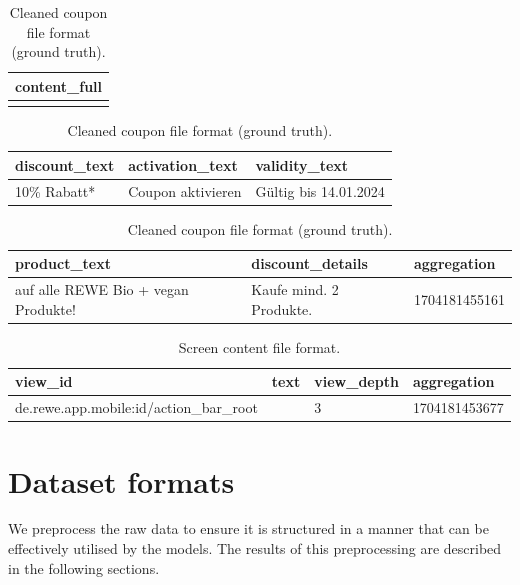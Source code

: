 \documentclass[licencjacka,en]{pracamgr}
\begin{document}
\begin{table}[htbp]
\centering

\begin{tabular}{|p{}|}
\hline
\textbf{content\_full} \\
\hline
[Treuepunkte, 10\% Rabatt*, auf alle REWE Bio + vegan Produkte!,
Kaufe mind. 2 Produkte., Gültig bis 14.01.2024, Coupon aktivieren] \\
\hline
\end{tabular}

\vspace{1em}

\begin{tabular}{|l|l|l|}
\hline
\textbf{discount\_text} & \textbf{activation\_text} & \textbf{validity\_text} \\
\hline
10\% Rabatt* & Coupon aktivieren & Gültig bis 14.01.2024 \\
\hline
\end{tabular}

\vspace{1em}

\begin{tabular}{|l|l|l|}
\hline
\textbf{product\_text} & \textbf{discount\_details} & \textbf{aggregation} \\
\hline
auf alle REWE Bio + vegan Produkte! & Kaufe mind. 2 Produkte. & 1704181455161 \\
\hline
\end{tabular}

\caption{Cleaned coupon file format (ground truth).}
\label{tab:coupons_rev_2}
\end{table}

\begin{table}[htbp]
\centering
\begin{tabular}{|l|l|l|l|}
\hline
\textbf{view\_id} & \textbf{text} & \textbf{view\_depth} & \textbf{aggregation} \\
\hline
de.rewe.app.mobile:id/action\_bar\_root &  & 3 & 1704181453677 \\
\hline
\end{tabular}
\caption{Screen content file format.}
\label{tab:coupons_rev_2_content}
\end{table}

\section{Dataset formats}
We preprocess the raw data to ensure it is structured in a manner that can be effectively utilised by the models. The results of this preprocessing are described in the following sections.
\end{document}
